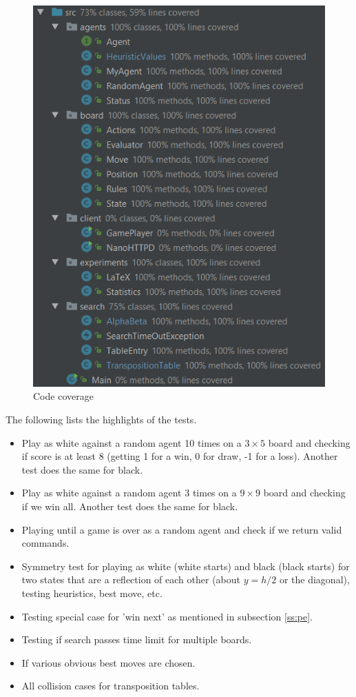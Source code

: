 \documentclass[11pt,a4paper,notitlepage]{article}
\begin{document}
\begin{figure}[H]
\begin{center}
\includegraphics[scale=1]{coverage.png}
\end{center}
\caption{Code coverage}
\label{fig:ccov}
\end{figure}

The following lists the highlights of the tests.
\begin{itemize}
\item Play as white against a random agent 10 times on a $3 \times 5$ board and checking if score is at least 8 (getting 1 for a win, 0 for draw, -1 for a loss). Another test does the same for black.
\item Play as white against a random agent 3 times on a $9 \times 9$ board and checking if we win all. Another test does the same for black.
\item Playing until a game is over as a random agent and check if we return valid commands.
\item Symmetry test for playing as white (white starts) and black (black starts) for two states that are a reflection of each other (about $y=h/2$ or the diagonal), testing heuristics, best move, etc.
\item Testing special case for 'win next' as mentioned in subsection \ref{ss:pe}.
\item Testing if search passes time limit for multiple boards.
\item If various obvious best moves are chosen.
\item All collision cases for transposition tables.
\end{itemize}
\end{document}
